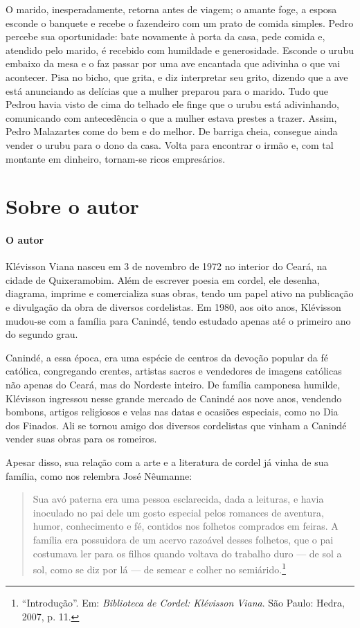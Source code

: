 \documentclass[11pt]{extarticle}
\begin{document}
O marido, inesperadamente, retorna antes de viagem; o amante foge, a esposa esconde o banquete e recebe o fazendeiro com um prato de comida simples.
Pedro percebe sua oportunidade: bate novamente à porta da casa, pede comida e, atendido pelo marido, é recebido com humildade e generosidade. Esconde o urubu embaixo da mesa e o faz passar por uma ave encantada que adivinha o que vai acontecer. Pisa no bicho, que grita, e diz interpretar seu grito, dizendo que a ave está anunciando as delícias que a mulher preparou para o marido. Tudo que Pedrou havia visto de cima do telhado ele finge que o urubu está adivinhando, comunicando com antecedência o que a mulher estava prestes a trazer.
Assim, Pedro Malazartes come do bem e do melhor. De barriga cheia, consegue ainda vender o urubu para o dono da casa.
Volta para encontrar o irmão e, com tal montante em dinheiro, tornam-se ricos empresários.

\reversemarginpar
\marginparwidth=5cm


\section{Sobre o autor}


\paragraph{O autor}
Klévisson Viana nasceu em 3 de novembro de 1972 no interior do Ceará, na cidade de Quixeramobim. Além de escrever poesia em cordel, ele desenha, diagrama, imprime e comercializa suas obras, tendo um papel ativo na publicação e divulgação da obra de diversos cordelistas. Em 1980, aos oito anos, Klévisson mudou-se com a família para Canindé, tendo estudado apenas até o primeiro ano do segundo grau.

Canindé, a essa época, era uma espécie de centros da devoção popular da fé católica, congregando crentes, artistas sacros e vendedores de imagens católicas não
apenas do Ceará, mas do Nordeste inteiro. De família camponesa humilde, Klévisson ingressou nesse grande mercado de Canindé aos nove anos, vendendo bombons, artigos religiosos e velas nas datas e ocasiões especiais, como no Dia dos Finados.
Ali se tornou amigo dos diversos cordelistas que vinham a Canindé vender suas obras para os romeiros.

Apesar disso, sua relação com a arte e a literatura de cordel já vinha de sua família, como nos relembra José Nêumanne:

\begin{quote}
Sua avó paterna era uma pessoa esclarecida, dada a leituras, e havia inoculado no pai dele um gosto especial pelos romances de aventura, humor, conhecimento e fé, contidos nos folhetos comprados em feiras. A família era possuidora de um acervo razoável desses folhetos, que o pai costumava ler para os filhos quando voltava do trabalho duro --- de sol a sol, como se diz por lá --- de semear e colher no semiárido.\footnote{``Introdução''. Em: \textit{Biblioteca de Cordel: Klévisson Viana}. São Paulo: Hedra, 2007, p. 11.}
\end{quote}
\end{document}
